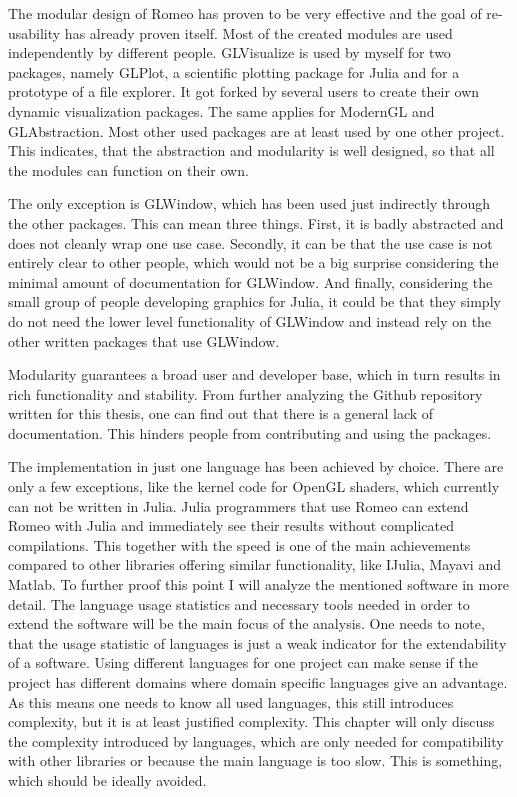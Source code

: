 The modular design of Romeo has proven to be very effective and the goal of re-usability has already proven itself.
Most of the created modules are used independently by different people.
GLVisualize is used by myself for two packages, namely GLPlot, a scientific plotting package for Julia and for a prototype of a file explorer.
It got forked by several users to create their own dynamic visualization packages.
The same applies for ModernGL and GLAbstraction. Most other used packages are at least used by one other project.
This indicates, that the abstraction and modularity is well designed, so that all the modules can function on their own.

The only exception is GLWindow, which has been used just indirectly through the other packages. 
This can mean three things.
First, it is badly abstracted and does not cleanly wrap one use case.
Secondly, it can be that the use case is not entirely clear to other people, which would not be a big surprise considering the minimal amount of documentation for GLWindow.
And finally, considering the small group of people developing graphics for Julia, it could be that they simply do not need the lower level functionality of GLWindow and instead rely on the other written packages that use GLWindow.

Modularity guarantees a broad user and developer base, which in turn results in rich functionality and stability.
From further analyzing the Github repository written for this thesis, one can find out that there is a general lack of documentation.
This hinders people from contributing and using the packages.

The implementation in just one language has been achieved by choice. There are only a few exceptions, like the kernel code for OpenGL shaders, which currently can not be written in Julia. 
Julia programmers that use Romeo can extend Romeo with Julia and immediately see their results without complicated compilations.
This together with the speed is one of the main achievements compared to other libraries offering similar functionality, like IJulia, Mayavi and Matlab.
To further proof this point I will analyze the mentioned software in more detail.
The language usage statistics and necessary tools needed in order to extend the software will be the main focus of the analysis.
One needs to note, that the usage statistic of languages is just a weak indicator for the extendability of a software.
Using different languages for one project can make sense if the project has different domains where domain specific languages give an advantage. As this means one needs to know all used languages, this still introduces complexity, but it is at least justified complexity.
This chapter will only discuss the complexity introduced by languages, which are only needed for compatibility with other libraries or because the main language is too slow. This is something, which should be ideally avoided.


